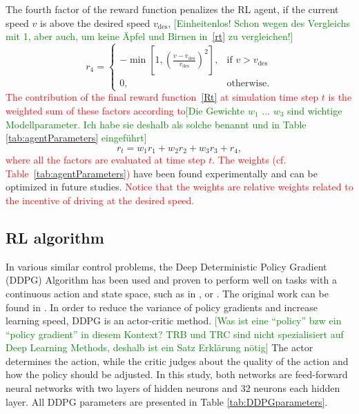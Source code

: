 \documentclass[review]{elsarticle}
\providecommand{\red}[1]{\textcolor{red}{#1}}
\providecommand{\green}[1]{\textcolor{green}{#1}}
\providecommand{\martin}[1]{\red{#1}} %
\providecommand{\martinc}[1]{\green{[#1]}} %
\providecommand{\sub}[1]{_{\mathrm{#1}}}  %
\providecommand{\3}{{\ss}}
\begin{document}
 The fourth factor of the reward function penalizes the RL agent, if
 the current speed $v$ is above the desired speed $v\sub{des}$,
 \martinc{Einheitenlos! Schon wegen des Vergleichs mit 1, aber auch,
   um keine \"Apfel und Birnen in~\eqref{rt} zu vergleichen!}
\begin{equation}
r_4 =  
\begin{cases} 
 -\min\left[1,\left(\frac{v - v\sub{des}}{v\sub{des}}\right)^2\right], & \text{if } v>v\sub{des}\\
0, & \text{otherwise.}
\end{cases}             
\end{equation}
%
\martin{The contribution of the final reward function~\eqref{Rt}  at simulation time step $t$ is the weighted
sum of these factors according to}\martinc{Die Gewichte $w_1$
  ... $w_3$ sind wichtige Modellparameter. Ich habe sie deshalb als
  solche benannt und in Table \ref{tab:agentParameters} eingef\"uhrt}
\begin{equation}
\label{rt}
r_t = w_1r_1 + w_2r_2+w_3r_3 + r_4,
\end{equation}
\martin{where all the factors are evaluated at time step $t$. The weights (cf.
Table~\ref{tab:agentParameters})} have been found experimentally and
can be optimized in future studies. \martin{Notice that the weights are
relative weights related to the incentive of driving at the desired
speed.}


\subsection{\label{RL-algorithm}RL algorithm}
In various similar control problems, the Deep Deterministic Policy
Gradient (DDPG) Algorithm has been used and proven to perform well on
tasks with a continuous action and state space, such as in
\cite{SafeEfficientAndComfortable}, \cite{ComparisonRLvsMPC} or
\cite{HumanLikeAutonomouCF}. The original work can be found in
\cite{DDPG}. In order to reduce the variance of policy gradients and
increase learning speed, DDPG is an actor-critic method. \martinc{Was
  ist eine ``policy'' bzw ein ``policy gradient'' in diesem Kontext? TRB und TRC sind nicht spezialisiert
  auf Deep Learning Methods, deshalb ist ein Satz Erkl\"arung n\"otig} The actor determines the action, while the critic judges about the quality of the action and how the policy should be adjusted. In this study, both networks are feed-forward neural networks with two layers of hidden neurons and 32 neurons each hidden layer. All DDPG parameters are presented in Table \ref{tab:DDPGparameters}.
\end{document}
